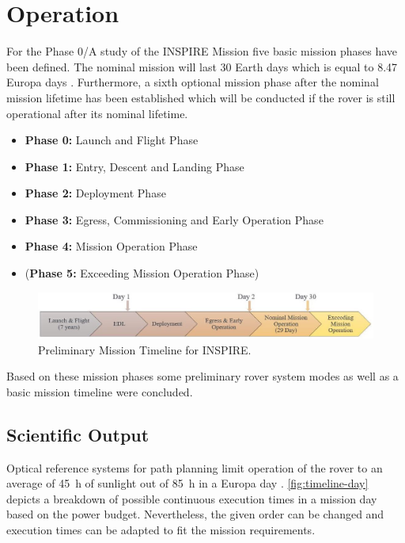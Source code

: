 \chapter{Operation}
\label{chap:Operation}

For the Phase 0/A study of the INSPIRE Mission five basic mission phases have been defined. The nominal mission will last 30 Earth days which is equal to 8.47 Europa days \cite{Europa}. Furthermore, a sixth optional mission phase after the nominal mission lifetime has been established which will be conducted if the rover is still operational after its nominal lifetime.

\begin{itemize}
\itemsep0pt
\item	\textbf{Phase 0:} Launch and Flight Phase
\item	\textbf{Phase 1:} Entry, Descent and Landing Phase
\item	\textbf{Phase 2:} Deployment Phase
\item	\textbf{Phase 3:} Egress, Commissioning and Early Operation Phase
\item	\textbf{Phase 4:} Mission Operation Phase
\item	(\textbf{Phase 5:} Exceeding Mission Operation Phase) 
\end{itemize}

\begin{figure}[H]
{\centering
\includegraphics[width=1\textwidth]{Media/timeline}
\caption{Preliminary Mission Timeline for INSPIRE.}
\label{fig:timeline}
}
\end{figure}

Based on these mission phases some preliminary rover system modes as well as a basic mission timeline were concluded.

\section{Scientific Output}
\label{chap:sc-output}

Optical reference systems for path planning limit operation of the rover to an average of 45~h of sunlight out of 85~h in a Europa day \cite{Europa}. \autoref{fig:timeline-day} depicts a breakdown of possible continuous execution times in a mission day based on the power budget. Nevertheless, the given order can be changed and execution times can be adapted to fit the mission requirements. \\

